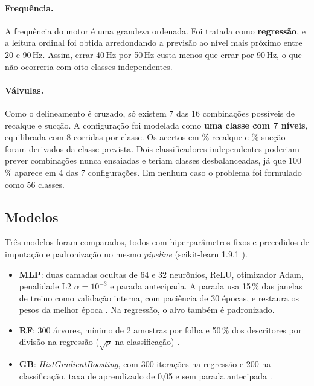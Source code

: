 \documentclass[12pt]{article}
\begin{document}
\paragraph{Frequência.} A frequência do motor é uma grandeza ordenada. Foi tratada como \textbf{regressão}, e a leitura ordinal foi obtida arredondando a previsão ao nível mais próximo entre 20 e 90\,Hz. Assim, errar 40\,Hz por 50\,Hz custa menos que errar por 90\,Hz, o que não ocorreria com oito classes independentes.

\paragraph{Válvulas.} Como o delineamento é cruzado, só existem 7 das 16 combinações possíveis de recalque e sucção. A configuração foi modelada como \textbf{uma classe com 7 níveis}, equilibrada com 8 corridas por classe. Os acertos em \% recalque e \% sucção foram derivados da classe prevista. Dois classificadores independentes poderiam prever combinações nunca ensaiadas e teriam classes desbalanceadas, já que 100\,\% aparece em 4 das 7 configurações. Em nenhum caso o problema foi formulado como 56 classes.

\subsection{Modelos}

Três modelos foram comparados, todos com hiperparâmetros fixos e precedidos de imputação e padronização no mesmo \textit{pipeline} (scikit-learn 1.9.1 \cite{pedregosa2011}).

\begin{itemize}
	\item \textbf{MLP}: duas camadas ocultas de 64 e 32 neurônios, ReLU, otimizador Adam, penalidade L2 \(\alpha = 10^{-3}\) e parada antecipada. A parada usa 15\,\% das janelas de treino como validação interna, com paciência de 30 épocas, e restaura os pesos da melhor época \cite{prechelt1998}. Na regressão, o alvo também é padronizado.
	\item \textbf{RF}: 300 árvores, mínimo de 2 amostras por folha e 50\,\% dos descritores por divisão na regressão (\(\sqrt{p}\) na classificação) \cite{breiman2001}.
	\item \textbf{GB}: \textit{HistGradientBoosting}, com 300 iterações na regressão e 200 na classificação, taxa de aprendizado de 0,05 e sem parada antecipada \cite{friedman2001}.
\end{itemize}
\end{document}
